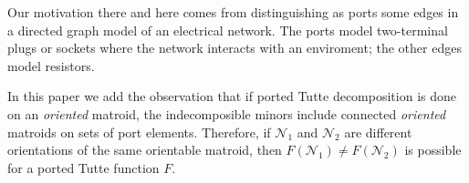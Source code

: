 Our motivation there and here
comes from distinguishing as ports some edges
in a directed graph model of an electrical network.  The ports
model two-terminal plugs or sockets where the network interacts
with an enviroment; the other edges model resistors.

In this paper we add the observation that if ported Tutte 
decomposition is done on an \emph{oriented} matroid, the indecomposible
minors include connected \emph{oriented} matroids on sets of port elements.
Therefore, if $\mathcal{N}_1$ and $\mathcal{N}_2$ are different orientations
of the same orientable matroid, then 
$F(\mathcal{N}_1)\neq F(\mathcal{N}_2)$ is possible for a ported
Tutte function $F$.  
